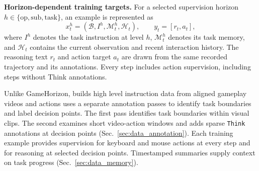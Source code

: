 \textbf{Horizon-dependent training targets.}
For a selected supervision horizon $h\in\{\mathrm{op},\mathrm{sub},\mathrm{task}\}$, an example is represented as
\begin{equation}
    x_t^{h}=\left(\mathcal{B},I^{h},\mathcal{M}_t^{h},\mathcal{H}_t\right),
    \qquad y_t=[r_t,a_t],
    \label{eq:multi-level_supervision}
\end{equation}
where $I^{h}$ denotes the task instruction at level $h$, $\mathcal{M}_t^{h}$ denotes its task memory, and $\mathcal{H}_t$ contains the current observation and recent interaction history. The reasoning text $r_t$ and action target $a_t$ are drawn from the same recorded trajectory and its annotations. Every step includes action supervision, including steps without Think annotations.

 Unlike GameHorizon\cite{wang2026gamehorizon}, \ourmodel builds high level instruction data from aligned gameplay videos and actions uses a separate annotation passes to identify task boundaries and label decision points. The first pass identifies task boundaries within visual clips. The second examines short video-action windows and adds sparse \texttt{Think} annotations at decision points (Sec.~\ref{sec:data_annotation}). Each training example provides supervision for keyboard and mouse actions at every step and for reasoning at selected decision points. Timestamped summaries supply context on task progress (Sec.~\ref{sec:data_memory}).




